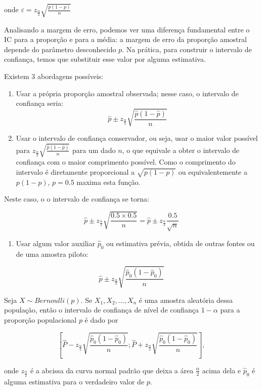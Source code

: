 \documentclass[
]{book}
\providecommand{\tightlist}{%
  \setlength{\itemsep}{0pt}\setlength{\parskip}{0pt}}
\begin{document}
onde \(\varepsilon=z_{\frac{\alpha}{2}}\sqrt{\frac{p(1-p)}{n}}\)

Analisando a margem de erro, podemos ver uma diferença fundamental entre o IC para a proporção e para a média: a margem de erro da proporção amostral depende do parâmetro desconhecido \(p\). Na prática, para construir o intervalo de confiança, temos que substituir esse valor por alguma estimativa.

Existem 3 abordagens possíveis:

\begin{enumerate}
\def\labelenumi{\arabic{enumi}.}
\item
  Usar a própria proporção amostral observada; nesse caso, o intervalo de confiança seria: \[\hat p \pm z_{\frac{\alpha}{2}}\sqrt{\frac{\hat p(1-\hat p)}{n}}\]
\item
  Usar o intervalo de confiança conservador, ou seja, usar o maior valor possível para \(z_{\frac{\alpha}{2}}\sqrt{\frac{\hat p(1-\hat p)}{n}}\) para um dado \(n\), o que equivale a obter o intervalo de confiança com o maior comprimento possível. Como o comprimento do intervalo é diretamente proporcional a \(\sqrt{p(1-p)}\) ou equivalentemente a \(p(1-p)\), \(p=0.5\) maxima esta função.
\end{enumerate}

Neste caso, o o intervalo de confiança se torna:

\[\hat p \pm z_{\frac{\alpha}{2}}\sqrt{\frac{0.5\times 0.5}{n}} = \hat p \pm z_{\frac{\alpha}{2}}\frac{0.5}{\sqrt{n}}\]

\begin{enumerate}
\def\labelenumi{\arabic{enumi}.}
\setcounter{enumi}{2}
\tightlist
\item
  Usar algum valor auxiliar \(\hat p_0\) ou estimativa prévia, obtida de outras fontes ou de uma amostra piloto:
\end{enumerate}

\[\hat p \pm z_{\frac{\alpha}{2}}\sqrt{\frac{\hat p_0(1-\hat p_0)}{n}}\]

Seja \(X\sim Bernoulli(p)\). Se \(X_1,X_2,\ldots,X_n\) é uma amostra aleatória dessa população, então o intervalo de confiança de nível de confiança \(1-\alpha\) para a proporção populacional \(p\) é dado por

\[\left[\hat P - z_{\frac{\alpha}{2}}\sqrt{\frac{\hat p_0(1-\hat p_0)}{n}};\hat P + z_{\frac{\alpha}{2}}\sqrt{\frac{\hat p_0(1-\hat p_0)}{n}}\right],\]

onde \(z_{\frac{\alpha}{2}}\) é a abcissa da curva normal padrão que deixa a área \(\frac{\alpha}{2}\) acima dela e \(\hat p_0\) é alguma estimativa para o verdadeiro valor de \(p\).
\end{document}
